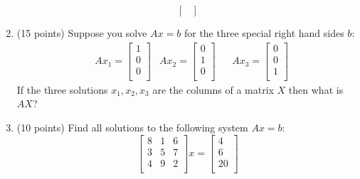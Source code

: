 \documentclass[10pt, a4paper]{article}
\theoremstyle{break}
\begin{document}
\begin{enumerate}
\begin{equation}
\begin{bmatrix}
\end{bmatrix}
\end{equation}
\item (15 points) Suppose you solve $Ax=b$ for the three special right hand sides $b$:
\begin{align}
& Ax_1=
\begin{bmatrix}
1 \\
0 \\
0\\
\end{bmatrix}
& Ax_2=
\begin{bmatrix}
0 \\
1 \\
0\\
\end{bmatrix}
& & Ax_3=
\begin{bmatrix}
0 \\
0 \\
1 \\
\end{bmatrix}
\end{align}
If the three solutions $x_1,x_2,x_3$ are the columns of a matrix $X$ then what is $AX$?
\item (10 points) Find all solutions to the following system $Ax=b$:
\begin{equation}
\begin{bmatrix}
8 & 1 & 6 \\
3&5& 7\\
4 & 9 &2 \\
\end{bmatrix}
x=
\begin{bmatrix}
4 \\
6 \\
20 \\
\end{bmatrix}
\end{equation}
\end{enumerate}
\end{document}
